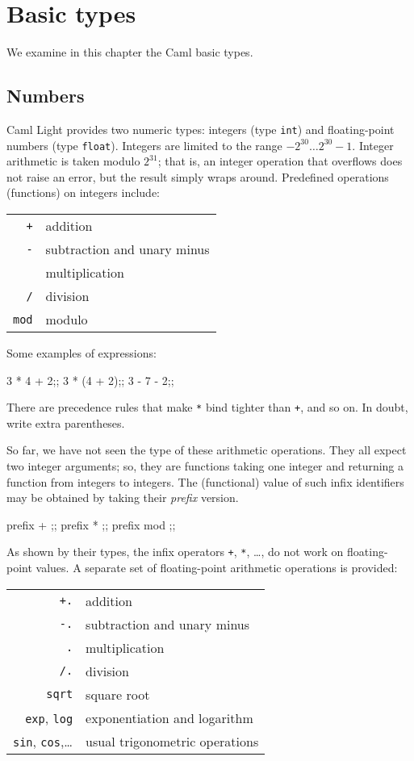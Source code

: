 \chapter{Basic types}
\label{c:basic}

We examine in this chapter the Caml basic types.

\section{Numbers}

Caml Light provides two numeric types: integers (type \verb"int") and
floating-point numbers (type \verb"float"). Integers are limited to
the range $-2^{30} \ldots 2^{30}-1$. Integer arithmetic is taken modulo
$2^{31}$; that is, an integer operation that overflows does not raise an
error, but the result simply wraps around. Predefined operations
(functions) on integers include:
\begin{center}
\begin{tabular}{rl}
{\tt +} &addition\\
{\tt -} &subtraction and unary minus\\
{\tt *} &multiplication\\
{\tt /} &division\\
{\tt mod} &modulo
\end{tabular}
\end{center}

Some examples of expressions:
\begin{caml_example}
3 * 4 + 2;;
3 * (4 + 2);;
3 - 7 - 2;;
\end{caml_example}
There are precedence rules that make \verb"*" bind tighter than \verb"+", and so on. In doubt, write extra parentheses.
\par
So far, we have not seen the type of these arithmetic operations.
They all expect  two integer arguments; so, they are functions taking
one integer and returning a function from integers to integers.
The (functional) value of such infix identifiers may be obtained by taking
their {\em prefix} version.
\begin{caml_example}
prefix + ;;
prefix * ;;
prefix mod ;;
\end{caml_example}

As shown by their types, the infix operators \verb"+", \verb"*",
\ldots, do not work on floating-point values. A separate set of
floating-point arithmetic operations is provided:

\begin{center}
\begin{tabular}{rl}
{\tt +.} &addition\\
{\tt -.} &subtraction and unary minus\\
{\tt *.} &multiplication\\
{\tt /.} &division\\
\verb"sqrt" & square root \\
\verb"exp", \verb"log" & exponentiation and logarithm \\
\verb"sin", \verb"cos",\ldots & usual trigonometric operations
\end{tabular}
\end{center}

